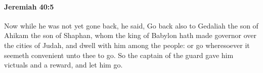 
		\paragraph{Jeremiah 40:5} %
			\label{JEREMIAH-40-5}

			Now while he was not yet gone back, he said, Go back also to Gedaliah the son of Ahikam the son of Shaphan, whom the king of Babylon hath made governor over the cities of Judah, and dwell with him among the people: or go wheresoever it seemeth convenient unto thee to go. So the captain of the guard gave him victuals and a reward, and let him go.


